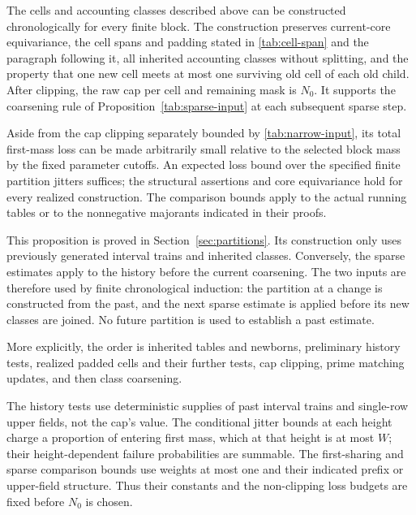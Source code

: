 \begin{proposition}
\label{tab:partition-input}
The cells and accounting classes described above can be constructed
chronologically for every finite block.  The construction preserves
current-core equivariance, the cell spans and padding stated in
\eqref{tab:cell-span} and the paragraph following it, all inherited
accounting classes without splitting, and the property that one
new cell meets at most one surviving old cell of each old child.
After clipping, the raw cap per cell and remaining mask is $N_0$.
It supports the coarsening rule of
Proposition~\ref{tab:sparse-input} at each subsequent sparse step.

Aside from the cap clipping separately bounded by
\eqref{tab:narrow-input}, its total first-mass loss can be made
arbitrarily small relative to the selected block mass by the fixed
parameter cutoffs.  An expected loss bound over the specified
finite partition jitters suffices; the structural assertions and
core equivariance hold for every realized construction.  The
comparison bounds apply to the actual running tables or to the
nonnegative majorants indicated in their proofs.
\end{proposition}

This proposition is proved in Section~\ref{sec:partitions}.  Its
construction only uses previously generated interval trains and
inherited classes.  Conversely, the sparse estimates apply to the
history before the current coarsening.  The two inputs are therefore
used by finite chronological induction: the partition at a change
is constructed from the past, and the next sparse estimate is
applied before its new classes are joined.  No future partition is
used to establish a past estimate.

More explicitly, the order
is inherited tables and newborns, preliminary history tests,
realized padded cells and their further tests, cap clipping,
prime matching updates, and then class coarsening.

The history
tests use deterministic supplies of past interval trains and
single-row upper fields, not the cap's value.  The conditional
jitter bounds at each height charge a proportion of entering
first mass, which at that height is at most $W$; their
height-dependent failure probabilities are summable.  The
first-sharing and sparse
comparison bounds use weights at most one and their indicated
prefix or upper-field structure.  Thus their constants and the
non-clipping loss budgets are fixed before $N_0$ is chosen.

